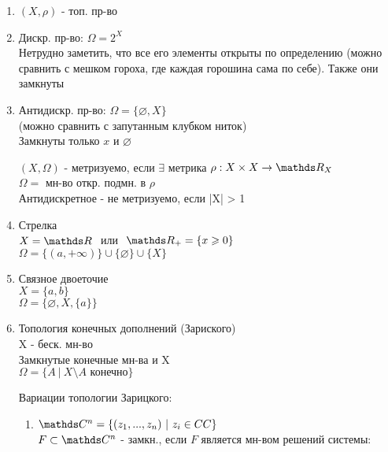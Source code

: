 \documentclass[geometry.tex]{subfiles}
\begin{document}
  \begin{examples}
      \begin{enumerate}
          \item $(X, \rho)$ - топ. пр-во
          \item Дискр. пр-во: $\Omega = 2^X$\\
          Нетрудно заметить, что все его элементы открыты по определению (можно сравнить с мешком гороха, где каждая горошина сама по себе). Также они замкнуты
          \item Антидискр. пр-во: $\Omega = \{\varnothing, X\}$\\
          (можно сравнить с запутанным клубком ниток)\\
          Замкнуты только $x$ и $\varnothing$

      \begin{definition}
          $(X, \Omega)$ - метризуемо, если $\exists$ метрика $\rho: X \times X \rightarrow \R_X$\\
          $\Omega = $ мн-во откр. подмн. в $\rho$\\
          Антидискретное - не метризуемо, если |X| > 1
      \end{definition}
          \item Стрелка\\
                $X = \R  \ $ или $\   \R_+ = \{x \geq 0\}$\\
                $\Omega = \{(a, +\infty)\} \cup \{\varnothing\} \cup \{X\}$
          \item Связное двоеточие\\
                $X = \{a, b\}$\\
                $\Omega = \{\varnothing, X, \{a\}\}$
          \item Топология конечных дополнений (Зариского)\\
                X - беск. мн-во\\
                Замкнутые конечные мн-ва и X \\
                $\Omega = \{A \  | \  X \setminus A \text{ конечно}\}$
          \begin{uutv}
            Вариации топологии Зарицкого:
            \begin{enumerate}
              \item $\CC^n = \{(z_1,...,z_n)\ |\ z_i \in CC\}$\\
              $F \subset \CC^n$ - замкн., если $F$ является мн-вом решений системы:\\ \ \\

\end{enumerate}
\end{uutv}
\end{enumerate}
\end{examples}
\end{document}
